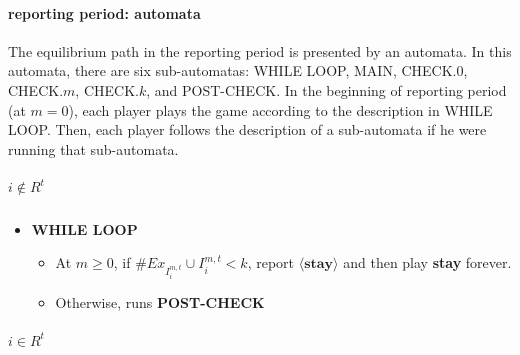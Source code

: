 \documentclass[12pt,letterpaper]{article}
\theoremstyle{definition}
\theoremstyle{remark}
\theoremstyle{claim}
\begin{document}
\paragraph{reporting period: automata}

The equilibrium path in the reporting period is presented by an automata. In this automata, there are six sub-automatas: WHILE LOOP, MAIN, CHECK.$0$, CHECK.$m$, CHECK.$k$, and POST-CHECK. In the beginning of reporting period (at $m=0$), each player plays the game according to the description in WHILE LOOP. Then, each player follows the description of a sub-automata if he were running that sub-automata.

\subparagraph{$i\notin R^{t}$}




\begin{itemize}
\item \textbf{WHILE LOOP}
\begin{itemize}
\item At $m\geq 0$, if $\#Ex_{I^{m,t}_i}\cup I^{m,t}_i< k$, report $\langle \textbf{stay} \rangle$ and then play \textbf{stay} forever.
\item Otherwise, runs \textbf{POST-CHECK }
\end{itemize}
\end{itemize}

\subparagraph{$i\in R^{t}$}
\end{document}
